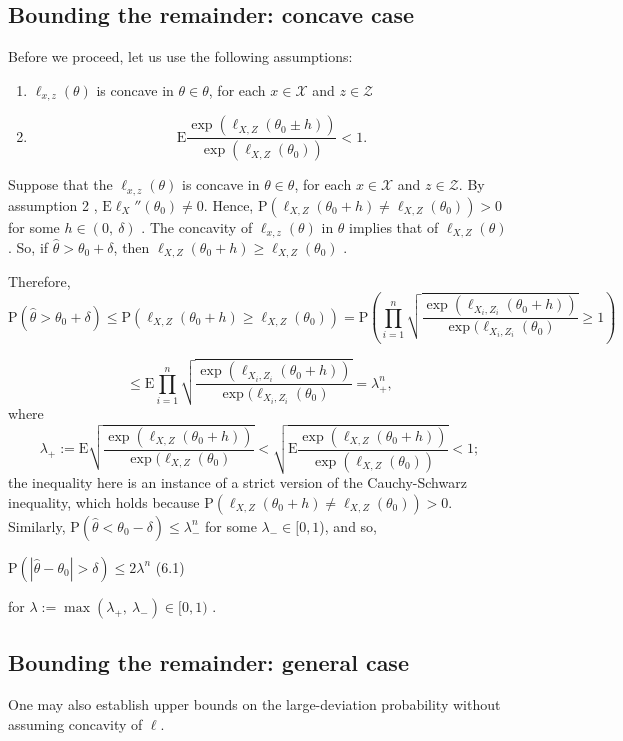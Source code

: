 \subsection*{Bounding the remainder: concave case}

Before we proceed, let us use the following assumptions:

\begin{enumerate}
	\item $\ell_{x,z}(\theta)$ is concave in $\theta\in\theta$, for each $x\in \mathcal{X}$ and $z\in \mathcal{Z}$
	\item $$
	\mathrm{E}\frac{\exp(\ell_{X,Z}(\theta_{0}\pm h))}{\exp(\ell_{X,Z}(\theta_{0}))} < 1.$$
\end{enumerate}

Suppose that the $\ell_{x,z}(\theta)$ is concave in $\theta\in\theta$, for each $x\in \mathcal{X}$ and $z\in \mathcal{Z}$. By assumption 2 , $\mathrm{E}\ell_{X}''(\theta_{0})\neq 0$. Hence, $\mathrm{P}(\ell_{X,Z}(\theta_{0}+h)\neq\ell_{X,Z}(\theta_{0}))>0$ for some $h\in(0,\ \delta)$ . The concavity of $\ell_{x,z}(\theta)$ in $\theta$ implies that of $\ell_{X,Z}(\theta)$ . So, if $\hat{\theta}>\theta_{0}+\delta$, then $\ell_{X,Z}(\theta_{0}+h)\geq\ell_{X,Z}(\theta_{0})$ .

Therefore,
$$
\mathrm{P}(\hat{\theta}>\theta_{0}+\delta)\leq \mathrm{P}(\ell_{X,Z}(\theta_{0}+h)\geq\ell_{X,Z}(\theta_{0}))=\mathrm{P}(\prod_{i=1}^{n}\sqrt{\frac{\exp(\ell_{X_i,Z_i}(\theta_{0}+h))}{\exp(\ell_{X_i,Z_i}(\theta_{0})}}\geq 1)
$$

$$
\leq \mathrm{E}\prod_{i=1}^{n}\sqrt{\frac{\exp(\ell_{X_i,Z_i}(\theta_{0}+h))}{\exp(\ell_{X_i,Z_i}(\theta_{0})}}=\lambda_{+}^{n},
$$
where
$$
\lambda_{+}:=\mathrm{E}\sqrt{\frac{\exp(\ell_{X,Z}(\theta_{0}+h))}{\exp(\ell_{X,Z}(\theta_{0})}}<\sqrt{\mathrm{E}\frac{\exp(\ell_{X,Z}(\theta_{0}+h))}{\exp(\ell_{X,Z}(\theta_{0}))}} < 1;$$
the inequality here is an instance of a strict version of the Cauchy-Schwarz inequality, which holds because $\mathrm{P}(\ell_{X,Z}(\theta_{0}+h)\neq\ell_{X,Z}(\theta_{0}))>0$. Similarly, $\mathrm{P}(\hat{\theta}<\theta_{0}-\delta)\leq\lambda_{-}^{n}$ for some $\lambda_{-}\in[0,1$), and so,
\begin{center}
	$\mathrm{P}(|\hat{\theta}-\theta_{0}|>\delta)\leq 2\lambda^{n}$   (6.1)
\end{center}
for $\lambda :=\displaystyle \max(\lambda_{+},\ \lambda_{-})\in[0,1)$ .

\subsection*{Bounding the remainder: general case}
One may also establish upper bounds on the large-deviation probability without assuming concavity of $\ell$.